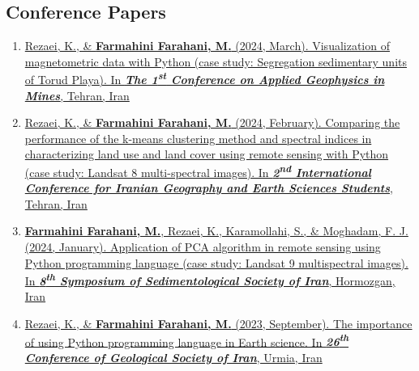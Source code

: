 \documentclass[letterpaper,11pt]{article}
\begin{document}
\begin{justify}
		\subsection*{Conference Papers}
		\begin{enumerate}[label=\arabic*.,left=0pt,topsep=7.5pt,partopsep=0pt,itemsep=3.5pt,parsep=0pt]
			\item \href{https://www.researchgate.net/publication/378739800_Visualization_of_magnetometric_data_with_Python_case_study_Segregation_sedimentary_units_of_Torud_Playa}{Rezaei, K., \& \textbf{Farmahini Farahani, M.} (2024, March). Visualization of magnetometric data with Python (case study: Segregation sedimentary units of Torud Playa). In \textit{\textbf{The 1\textsuperscript{st} Conference on Applied Geophysics in Mines}}, Tehran, Iran}
			\item \href{https://www.researchgate.net/publication/378307658_Comparing_the_performance_of_the_k-means_clustering_method_and_spectral_indices_in_characterizing_land_use_and_land_cover_using_remote_sensing_with_Python_case_study_Landsat_8_multi-spectral_images}{Rezaei, K., \& \textbf{Farmahini Farahani, M.} (2024, February). Comparing the performance of the k-means clustering method and spectral indices in characterizing land use and land cover using remote sensing with Python (case study: Landsat 8 multi-spectral images). In \textit{\textbf{2\textsuperscript{nd} International Conference for Iranian Geography and Earth Sciences Students}}, Tehran, Iran} 
			\item \href{https://www.researchgate.net/publication/377838524_Application_of_PCA_algorithm_in_remote_sensing_using_Python_programming_language_case_study_Landsat_9_multispectral_images}{\textbf{Farmahini Farahani, M.}, Rezaei, K., Karamollahi, S., \& Moghadam, F. J. (2024, January). Application of PCA algorithm in remote sensing using Python programming language (case study: Landsat 9 multispectral images). In \textit{\textbf{8\textsuperscript{th} Symposium of Sedimentological Society of Iran}}, Hormozgan, Iran}
			\item \href{https://www.researchgate.net/publication/374914382_The_importance_of_using_Python_programming_language_in_Earth_science}{Rezaei, K., \& \textbf{Farmahini Farahani, M.} (2023, September). The importance of using Python programming language in Earth science. In \textit{\textbf{26\textsuperscript{th} Conference of Geological Society of Iran}}, Urmia, Iran}
		\end{enumerate}
		

\end{justify}
\end{document}
